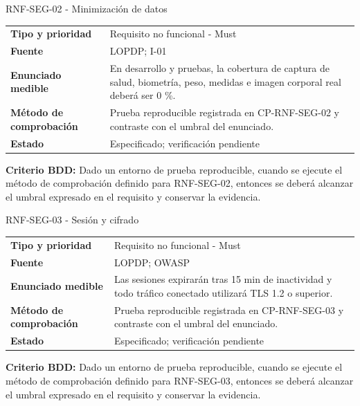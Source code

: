 \documentclass[11pt,a4paper]{article}
\begin{document}
\begin{reqbox}[colframe=Teal]{RNF-SEG-02 - Minimización de datos}
\begin{tabularx}{\textwidth}{>{\bfseries}p{3.2cm}Y}
Tipo y prioridad & Requisito no funcional - Must \\
Fuente & LOPDP; I-01 \\
Enunciado medible & En desarrollo y pruebas, la cobertura de captura de salud, biometría, peso, medidas e imagen corporal real deberá ser 0 \%. \\
Método de comprobación & Prueba reproducible registrada en CP-RNF-SEG-02 y contraste con el umbral del enunciado. \\
Estado & Especificado; verificación pendiente \\
\end{tabularx}
\textbf{Criterio BDD:} Dado un entorno de prueba reproducible, cuando se ejecute el método de comprobación definido para RNF-SEG-02, entonces se deberá alcanzar el umbral expresado en el requisito y conservar la evidencia.
\end{reqbox}


\begin{reqbox}[colframe=Teal]{RNF-SEG-03 - Sesión y cifrado}
\begin{tabularx}{\textwidth}{>{\bfseries}p{3.2cm}Y}
Tipo y prioridad & Requisito no funcional - Must \\
Fuente & LOPDP; OWASP \\
Enunciado medible & Las sesiones expirarán tras 15 min de inactividad y todo tráfico conectado utilizará TLS 1.2 o superior. \\
Método de comprobación & Prueba reproducible registrada en CP-RNF-SEG-03 y contraste con el umbral del enunciado. \\
Estado & Especificado; verificación pendiente \\
\end{tabularx}
\textbf{Criterio BDD:} Dado un entorno de prueba reproducible, cuando se ejecute el método de comprobación definido para RNF-SEG-03, entonces se deberá alcanzar el umbral expresado en el requisito y conservar la evidencia.
\end{reqbox}
\end{document}
